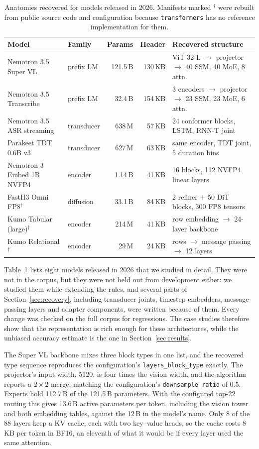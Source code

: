 \documentclass[11pt]{article}
\newcommand{\tn}[1]{\texttt{#1}}
\begin{document}
\begin{table}[t]
\centering
\footnotesize
\setlength{\tabcolsep}{4pt}
\begin{tabular}{@{}llrrl@{}}
\toprule
Model & Family & Params & Header & Recovered structure \\
\midrule
Nemotron 3.5 Super VL & prefix LM & 121.5\,B & 130\,KB & ViT 32 L $\to$ projector $\to$ 40 SSM, 40 MoE, 8 attn. \\
Nemotron 3.5 Transcribe & prefix LM & 32.4\,B & 154\,KB & 3 encoders $\to$ projector $\to$ 23 SSM, 23 MoE, 6 attn. \\
Nemotron 3.5 ASR streaming & transducer & 638\,M & 57\,KB & 24 conformer blocks, LSTM, RNN-T joint \\
Parakeet TDT 0.6B v3 & transducer & 627\,M & 63\,KB & same encoder, TDT joint, 5 duration bins \\
Nemotron 3 Embed 1B NVFP4 & encoder & 1.14\,B & 41\,KB & 16 blocks, 112 NVFP4 linear layers \\
FastH3 Omni FP8$^\dagger$ & diffusion & 33.1\,B & 84\,KB & 2 refiner + 50 DiT blocks, 300 FP8 tensors \\
Kumo Tabular (large)$^\dagger$ & encoder & 214\,M & 41\,KB & row embedding $\to$ 24-layer backbone \\
Kumo Relational$^\dagger$ & encoder & 29\,M & 24\,KB & rows $\to$ message passing $\to$ 12 layers \\
\bottomrule
\end{tabular}
\caption{Anatomies recovered for models released in 2026. Manifests marked $^\dagger$ were rebuilt from public source code and configuration because \tn{transformers} has no reference implementation for them.}
\label{tab:cases}
\end{table}

Table~\ref{tab:cases} lists eight models released in 2026 that we studied in detail. They were not in the corpus, but they were not held out from development either: we studied them while extending the rules, and several parts of Section~\ref{sec:recovery}, including transducer joints, timestep embedders, message-passing layers and adapter components, were written because of them. Every change was checked on the full corpus for regressions. The case studies therefore show that the representation is rich enough for these architectures, while the unbiased accuracy estimate is the one in Section~\ref{sec:results}.

The Super VL backbone mixes three block types in one list, and the recovered type sequence reproduces the configuration's \tn{layers\_block\_type} exactly. The projector's input width, 5120, is four times the vision width, and the algorithm reports a $2\times2$ merge, matching the configuration's \tn{downsample\_ratio} of 0.5. Experts hold 112.7\,B of the 121.5\,B parameters. With the configured top-22 routing this gives 13.6\,B active parameters per token, including the vision tower and both embedding tables, against the 12\,B in the model's name. Only 8 of the 88 layers keep a KV cache, each with two key--value heads, so the cache costs 8\,KB per token in BF16, an eleventh of what it would be if every layer used the same attention.
\end{document}
